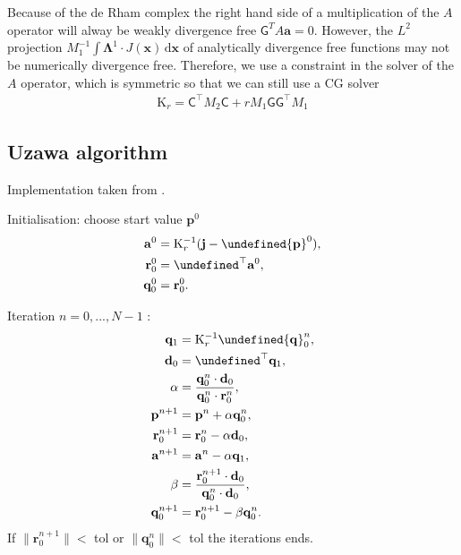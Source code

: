 \documentclass[12pt,a4paper,twoside]{article}
\let\L\undefined
\newcommand{\L}{\mathrm{L}}
\newcommand{\K}{\mathrm{K}}
\newcommand{\du}{\,\mathrm{d}}
\newcommand{\ab}{{\mathbf{a}}}
\newcommand{\xb}{{\mathbf{x}}}
\newcommand{\jb}{{\mathbf{j}}}
\newcommand{\pb}{{\mathbf{p}}}
\newcommand{\qb}{{\mathbf{q}}}
\newcommand{\rb}{{\mathbf{r}}}
\newcommand{\C}{\ensuremath{\mathsf{C}}}
\newcommand{\G}{\ensuremath{\mathsf{G}}}
\newcommand{\Lab}{\ensuremath{\boldsymbol{\Lambda}}}
\newcommand{\db}{\mathbf{d}}
\numberwithin{equation}{section}
\begin{document}
Because of the de Rham complex the right hand side of a multiplication of the $A$ operator will alway be weakly divergence free $\G^T A\ab = 0$. However, the $L^2$ projection $M_1^{-1} \int \Lab^1 \cdot J(\xb) \du \xb$ of analytically divergence free functions may not be numerically divergence free. Therefore, we use a constraint in the solver of the $A$ operator, which is symmetric so that we can still use a CG solver
\begin{align*}
\K_r= \C^\top M_2 \C + r M_1 \G \G^\top M_1 
\end{align*}
\subsection{Uzawa algorithm}
Implementation taken from \cite{uzawaiteration}.

Initialisation: choose start value $\pb^0$
\begin{align*}
\ab^0 &= \K_r^{-1}(\jb-\L \pb^0), \\
\rb_0^0 &= \L^\top \ab^0, \\
\qb_0^0 &= \rb_0^0. 
\end{align*}

Iteration $n=0,..., N-1$ :
\begin{align*}
\qb_1 &= \K_r^{-1} \L \qb_0^n,\\
\db_0 &=\L^\top \qb_1, \\
\alpha &= \frac{\qb_0^n \cdot \db_0 }{\qb_0^n \cdot \rb_0^n}, \\
\pb^{n+1} &= \pb^n + \alpha \qb_0^n, \\
\rb_0^{n+1} &= \rb_0^n - \alpha \db_0, \\
\ab^{n+1} &= \ab^n - \alpha \qb_1, \\
\beta &= \frac{\rb_0^{n+1} \cdot \db_0}{\qb_0^n \cdot \db_0}, \\
\qb_0^{n+1} &= \rb_0^{n+1} - \beta \qb_0^n.
\end{align*}
If $\|\rb_0^{n+1}\| < $ tol or $\|\qb_0^n\| < $ tol  the iterations ends.
\end{document}
